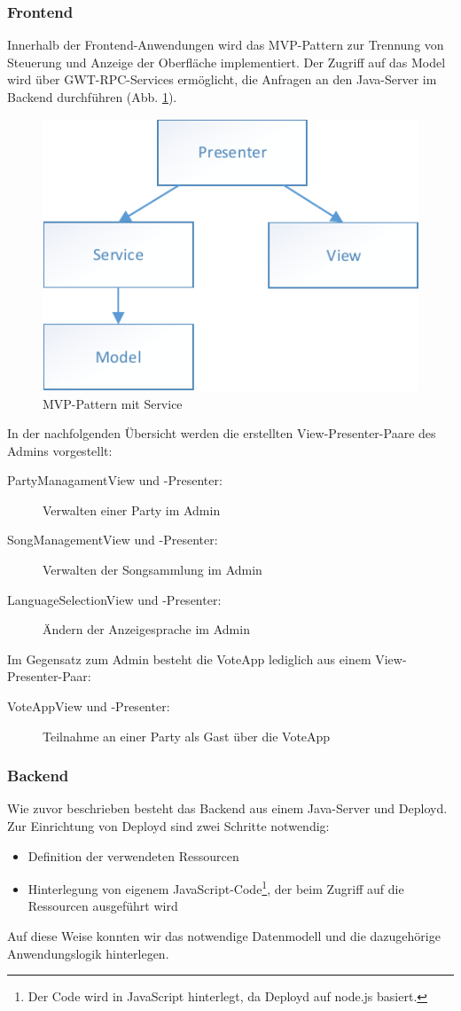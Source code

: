 \subsubsection{Frontend}
Innerhalb der Frontend-Anwendungen wird das MVP-Pattern zur Trennung von Steuerung und Anzeige der Oberfläche implementiert. Der Zugriff auf das Model wird über GWT-RPC-Services ermöglicht, die Anfragen an den Java-Server im Backend durchführen (Abb. \ref{fig:MVP-mit-Service}).

\begin{figure}[tbh]
\centering
\includegraphics[width=0.6\linewidth]{Bilder/MVP-mit-Service}
\caption{MVP-Pattern mit Service}
\label{fig:MVP-mit-Service}
\end{figure}

In der nachfolgenden Übersicht werden die erstellten View-Presenter-Paare des Admins vorgestellt:
\begin{description}
	\item[PartyManagamentView und -Presenter:] Verwalten einer Party im Admin
	\item[SongManagementView und -Presenter:] Verwalten der Songsammlung im Admin
	\item[LanguageSelectionView und -Presenter:] Ändern der Anzeigesprache im Admin
\end{description}

Im Gegensatz zum Admin besteht die VoteApp lediglich aus einem View-Presenter-Paar:

\begin{description}
	\item[VoteAppView und -Presenter:] Teilnahme an einer Party als Gast über die VoteApp
\end{description}

\subsubsection{Backend}
Wie zuvor beschrieben besteht das Backend aus einem Java-Server und Deployd.
Zur Einrichtung von Deployd sind zwei Schritte
notwendig:
\begin{itemize}
	\item Definition der verwendeten Ressourcen
	\item Hinterlegung von eigenem JavaScript-Code\footnote{Der Code wird in JavaScript hinterlegt, da Deployd auf node.js basiert.}, der beim Zugriff auf die Ressourcen ausgeführt wird
\end{itemize}
Auf diese Weise konnten wir das notwendige Datenmodell und die
dazugehörige Anwendungslogik hinterlegen.

